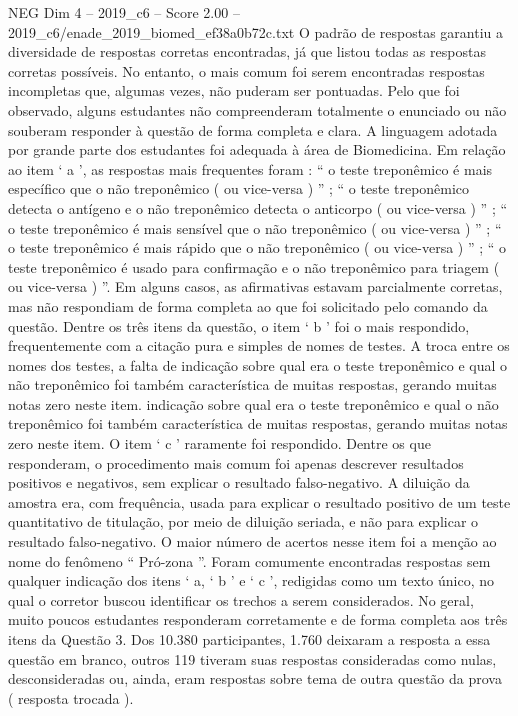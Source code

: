 \begin{textsample}{NEG Dim 4 – 2019\_c6 – Score 2.00 – 2019\_c6/enade\_2019\_biomed\_ef38a0b72c.txt}
O padrão de respostas garantiu a diversidade de respostas corretas encontradas, já que listou todas as respostas corretas possíveis.
No entanto, o mais comum foi serem encontradas respostas incompletas que, algumas vezes, não puderam ser pontuadas.
Pelo que foi observado, alguns estudantes não compreenderam totalmente o enunciado ou não souberam responder à questão de forma completa e clara.
A linguagem adotada por grande parte dos estudantes foi adequada à área de Biomedicina.
Em relação ao item ‘ a ’, as respostas mais frequentes foram : “ o teste treponêmico é mais específico que o não treponêmico ( ou vice-versa ) ” ; “ o teste treponêmico detecta o antígeno e o não treponêmico detecta o anticorpo ( ou vice-versa ) ” ; “ o teste treponêmico é mais sensível que o não treponêmico ( ou vice-versa ) ” ; “ o teste treponêmico é mais rápido que o não treponêmico ( ou vice-versa ) ” ; “ o teste treponêmico é usado para confirmação e o não treponêmico para triagem ( ou vice-versa ) ”.
Em alguns casos, as afirmativas estavam parcialmente corretas, mas não respondiam de forma completa ao que foi solicitado pelo comando da questão.
Dentre os três itens da questão, o item ‘ b ’ foi o mais respondido, frequentemente com a citação pura e simples de nomes de testes.
A troca entre os nomes dos testes, a falta de indicação sobre qual era o teste treponêmico e qual o não treponêmico foi também característica de muitas respostas, gerando muitas notas zero neste item. indicação sobre qual era o teste treponêmico e qual o não treponêmico foi também característica de muitas respostas, gerando muitas notas zero neste item.
O item ‘ c ’ raramente foi respondido.
Dentre os que responderam, o procedimento mais comum foi apenas descrever resultados positivos e negativos, sem explicar o resultado falso-negativo.
A diluição da amostra era, com frequência, usada para explicar o resultado positivo de um teste quantitativo de titulação, por meio de diluição seriada, e não para explicar o resultado falso-negativo.
O maior número de acertos nesse item foi a menção ao nome do fenômeno “ Pró-zona ”.
Foram comumente encontradas respostas sem qualquer indicação dos itens ‘ a, ‘ b ’ e ‘ c ’, redigidas como um texto único, no qual o corretor buscou identificar os trechos a serem considerados.
No geral, muito poucos estudantes responderam corretamente e de forma completa aos três itens da Questão 3.
Dos 10.380 participantes, 1.760 deixaram a resposta a essa questão em branco, outros 119 tiveram suas respostas consideradas como nulas, desconsideradas ou, ainda, eram respostas sobre tema de outra questão da prova ( resposta trocada ).

\end{textsample}
